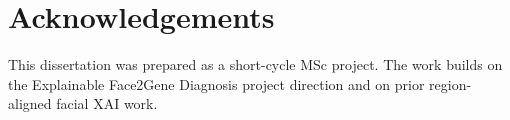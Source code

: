 \section*{\centering Acknowledgements}
\vspace{12pt}
This dissertation was prepared as a short-cycle MSc project. The work builds on the Explainable Face2Gene Diagnosis project direction and on prior region-aligned facial XAI work.

